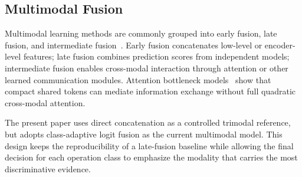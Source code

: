 \subsection{Multimodal Fusion}

Multimodal learning methods are commonly grouped into early fusion, late fusion, and intermediate fusion~\cite{baltrusaitis2018multimodal}. Early fusion concatenates low-level or encoder-level features; late fusion combines prediction scores from independent models; intermediate fusion enables cross-modal interaction through attention or other learned communication modules. Attention bottleneck models~\cite{nagrani2021attention} show that compact shared tokens can mediate information exchange without full quadratic cross-modal attention.

The present paper uses direct concatenation as a controlled trimodal reference, but adopts class-adaptive logit fusion as the current multimodal model. This design keeps the reproducibility of a late-fusion baseline while allowing the final decision for each operation class to emphasize the modality that carries the most discriminative evidence.
